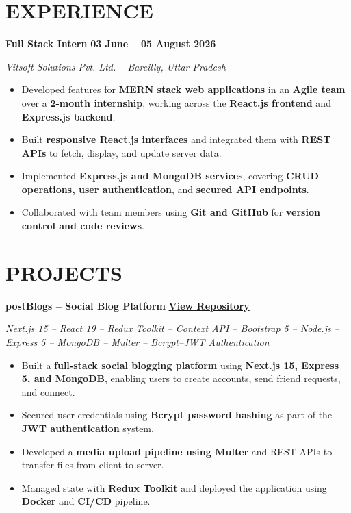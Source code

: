 \documentclass[10pt,a4paper]{article}
\begin{document}
\section{EXPERIENCE}

\textbf{Full Stack Intern}
\hfill
\textbf{03 June -- 05 August 2026}

\textit{Vitsoft Solutions Pvt. Ltd. -- Bareilly, Uttar Pradesh}

\begin{itemize}
    \item Developed features for \textbf{MERN stack web applications}
    in an \textbf{Agile team} over a \textbf{2-month internship}, working across
    the \textbf{React.js frontend} and \textbf{Express.js backend}.

    \item Built \textbf{responsive React.js interfaces} and integrated
    them with \textbf{REST APIs} to fetch, display, and update server data.

    \item Implemented \textbf{Express.js and MongoDB services}, covering
    \textbf{CRUD operations, user authentication}, and \textbf{secured API endpoints}.


    \item Collaborated with team members using \textbf{Git and GitHub}
    for \textbf{version control and code reviews}.
\end{itemize}

\section{PROJECTS}

\textbf{postBlogs -- Social Blog Platform}
\hfill
\href{https://post-blogs-ten.vercel.app/dashboard}
{\textbf{View Repository}}

\textit{Next.js 15 -- React 19 -- Redux Toolkit -- Context API --
Bootstrap 5 -- Node.js -- Express 5 -- MongoDB -- Multer -- Bcrypt--JWT Authentication}

\begin{itemize}
    \item Built a \textbf{full-stack social blogging platform}
    using \textbf{Next.js 15, Express 5, and MongoDB}, enabling users
    to create accounts, send friend requests, and connect.

    \item Secured user credentials using \textbf{Bcrypt password hashing}
    as part of the \textbf{ JWT authentication} system.

    \item Developed a \textbf{media upload pipeline using Multer}
    and REST APIs to transfer files from client to server.

\item Managed state with  \textbf{Redux Toolkit} and deployed the application using \textbf{Docker} and  \textbf{ CI/CD} pipeline.
\end{itemize}
\end{document}
